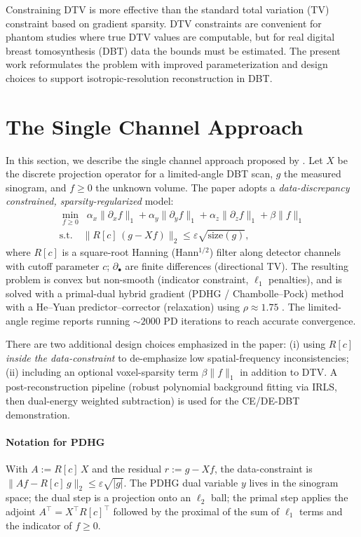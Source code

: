 \documentclass[journal, a4paper]{IEEEtran}
\begin{document}
Constraining DTV is more effective than the standard total variation (TV) constraint based on gradient sparsity. DTV constraints are convenient for phantom studies where true DTV values are computable, but for real digital breast tomosynthesis (DBT) data the bounds must be estimated. The present work reformulates the problem with improved parameterization and design choices to support isotropic-resolution reconstruction in DBT.


\section{The Single Channel Approach }
In this section, we describe the single channel approach proposed by \cite{sidky2025accurate}. Let $X$ be the discrete projection operator for a limited-angle DBT scan, $g$ the measured sinogram, and $f \ge 0$ the unknown volume. The paper adopts a \emph{data-discrepancy constrained, sparsity-regularized} model:
\begin{equation}
\label{eq:model}
\begin{split}
    \min_{f \ge 0}\;\; 
\alpha_x \|\partial_x f\|_1 + \alpha_y \|\partial_y f\|_1 + \alpha_z \|\partial_z f\|_1 + \beta \|f\|_1
\\
\text{s.t.} \quad 
\big\|R[c]\,(g - X f)\big\|_2 \le \varepsilon \sqrt{\mathrm{size}(g)},
\end{split}
\end{equation}
where $R[c]$ is a square-root Hanning (Hann$^{1/2}$) filter along detector channels with cutoff parameter $c$; $\partial_\bullet$ are finite differences (directional TV). The resulting problem is convex but non-smooth (indicator constraint, $\ell_1$ penalties), and is solved with a primal-dual hybrid gradient (PDHG / Chambolle--Pock) method with a He--Yuan predictor--corrector (relaxation) using $\rho \approx 1.75$ \cite{he2012convergence}. The limited-angle regime reports running $\sim 2000$ PD iterations to reach accurate convergence.

There are two additional design choices emphasized in the paper:
(i) using $R[c]$ \emph{inside the data-constraint} to de-emphasize low spatial-frequency inconsistencies; 
(ii) including an optional voxel-sparsity term $\beta\|f\|_1$ in addition to DTV. 
A post-reconstruction pipeline (robust polynomial background fitting via IRLS, then dual-energy weighted subtraction) is used for the CE/DE-DBT demonstration.

\paragraph{Notation for PDHG} With $A := R[c]\,X$ and the residual $r := g - X f$, the data-constraint is $ \|A f - R[c]\,g\|_2 \le \varepsilon\sqrt{|g|}$. The PDHG dual variable $y$ lives in the sinogram space; the dual step is a projection onto an $\ell_2$ ball; the primal step applies the adjoint $A^\top = X^\top R[c]^\top$ followed by the proximal of the sum of $\ell_1$ terms and the indicator of $f\ge 0$.
\end{document}
